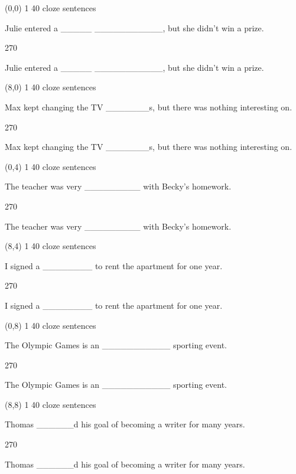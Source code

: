 \documentclass[a4paper]{article}
\newenvironment{itemize*}%
{\begin{itemize}%
 \setlength{\itemsep}{0.5cm}%
 \setlength{\parsep}{0pt}%
 \setlength{\parskip}{0pt}}%
{\end{itemize}}
\newcommand{\mycard}[3]{%
	\small #1 #2
	\par
	\parbox[t][6.8cm][c]{9.5cm}{%
	\par
	\myleft{#3}
	\par
	\myright{#3}
	}
}
\newcommand{\myleft}[1]{%
	\begin{sideways}
	\hspace*{-0.9cm}
		\parbox[t][2.7cm][t]{6.5cm}{%
		\large #1
		}
	\end{sideways}
}
\newcommand{\myright}[1]{%
	\hspace*{6.5cm}
	\begin{turn}{270}
	\hspace*{-7.1cm}
		\parbox[t][2.7cm][t]{6.5cm}{%
		\large #1
		}
	\end{turn}
}
\begin{document}
\null
\newpage

\begin{textblock}{8}(0,0)
\mycard{1}{40 cloze sentences}{
\begin{itemize*}
\item Julie entered a \_\_\_\_\_ \_\_\_\_\_\_\_\_\_\_\_, but she didn't win a prize.
\end{itemize*}
}
\end{textblock}

\begin{textblock}{8}(8,0)
\mycard{1}{40 cloze sentences}{
\begin{itemize*}
\item Max kept changing the TV \_\_\_\_\_\_\_s, but there was nothing interesting on.
\end{itemize*}
}
\end{textblock}

\begin{textblock}{8}(0,4)
\mycard{1}{40 cloze sentences}{
\begin{itemize*}
\item The teacher was very \_\_\_\_\_\_\_\_\_ with Becky's homework. 
\end{itemize*}
}
\end{textblock}

\begin{textblock}{8}(8,4)
\mycard{1}{40 cloze sentences}{
\begin{itemize*}
\item I signed a \_\_\_\_\_\_\_\_ to rent the apartment for one year. 
\end{itemize*}
}
\end{textblock}

\begin{textblock}{8}(0,8)
\mycard{1}{40 cloze sentences}{
\begin{itemize*}
\item The Olympic Games is an \_\_\_\_\_\_\_\_\_\_\_ sporting event.
\end{itemize*}
}
\end{textblock}

\begin{textblock}{8}(8,8)
\mycard{1}{40 cloze sentences}{
\begin{itemize*}
\item Thomas \_\_\_\_\_\_d his goal of becoming a writer for many years.
\end{itemize*}
}
\end{textblock}
\end{document}
